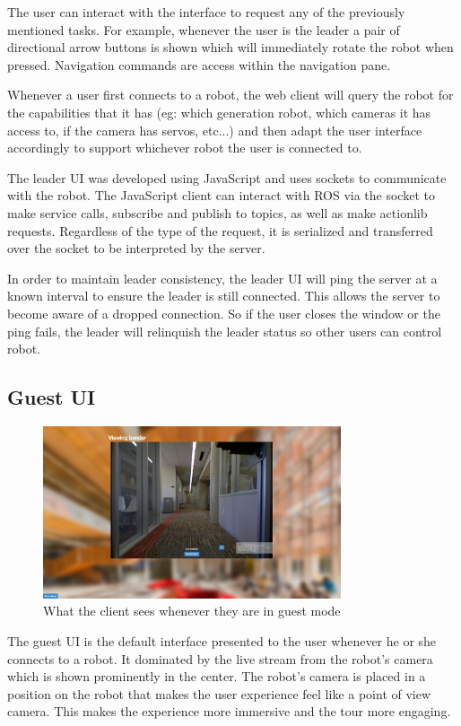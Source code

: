 \documentclass[
  oneside,
  11pt, a4paper,
  footinclude=true,
  headinclude=true,
  cleardoublepage=empty
]{article}
\begin{document}
The user can interact with the interface to request any of the previously
mentioned tasks. For example, whenever the user is the leader a pair of
directional arrow buttons is shown which will immediately rotate the robot when
pressed. Navigation commands are access within the navigation pane.

Whenever a user first connects to a robot, the web client will query the robot
for the capabilities that it has (eg: which generation robot, which cameras it
has access to, if the camera has servos, etc...) and then adapt the user
interface accordingly to support whichever robot the user is connected to.

The leader UI was developed using JavaScript and uses sockets to
communicate with the robot. The JavaScript client can interact with ROS via the
socket to make service calls, subscribe and publish to topics, as well as make
actionlib requests. Regardless of the type of the request, it is serialized and
transferred over the socket to be interpreted by the server.

In order to maintain leader consistency, the leader UI will ping the server at
a known interval to ensure the leader is still connected. This allows the
server to become aware of a dropped connection. So if the user closes the window
or the ping fails, the leader will relinquish the leader status so other users
can control robot.


\subsection{Guest UI}

\begin{figure}
\centering
\includegraphics[height=2in]{guestUI}
\caption{What the client sees whenever they are in guest mode}
\end{figure}

The guest UI is the default interface presented to the user whenever he or she
connects to a robot. It dominated by the live stream from the robot's camera
which is shown prominently in the center. The robot's camera is placed in a
position on the robot that makes the user experience feel like a point of view
camera. This makes the experience more immersive and the tour more engaging.
\end{document}
